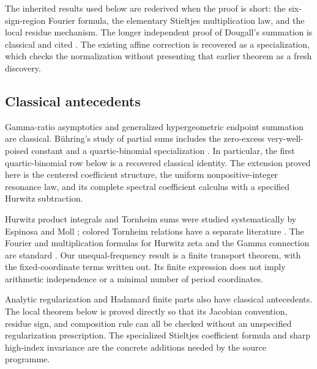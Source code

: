 The inherited results used below are rederived when the proof is short:
the six-sign-region Fourier formula, the elementary Stieltjes
multiplication law, and the local residue mechanism. The longer
independent proof of Dougall's summation is classical and cited
\cite[Eq.~16.4.9]{dlmf-hyper}. The existing affine correction is recovered
as a specialization, which checks the normalization without presenting
that earlier theorem as a fresh discovery.

\subsection{Classical antecedents}
Gamma-ratio asymptotics and generalized hypergeometric endpoint summation
are classical. B\"uhring's study of partial sums includes the zero-excess
very-well-poised constant and a quartic-binomial specialization
\cite[Section 4]{buhring}. In particular, the first quartic-binomial row
below is a recovered classical identity. The extension proved here is
the centered coefficient structure, the uniform nonpositive-integer
resonance law, and its complete spectral coefficient calculus with a
specified Hurwitz subtraction.

Hurwitz product integrals and Tornheim sums were studied systematically
by Espinosa and Moll \cite{em-hurwitz,em-tornheim}; colored Tornheim
relations have a separate literature \cite{zhao}. The Fourier and
multiplication formulas for Hurwitz zeta and the Gamma connection are
standard \cite{dlmf-hurwitz}. Our unequal-frequency result is a finite
transport theorem, with the fixed-coordinate terms written out. Its
finite expression does not imply arithmetic independence or a minimal
number of period coordinates.

Analytic regularization and Hadamard finite parts also have classical
antecedents. The local theorem below is proved directly so that its
Jacobian convention, residue sign, and composition rule can all be
checked without an unspecified regularization prescription. The
specialized Stieltjes coefficient formula and sharp high-index
invariance are the concrete additions needed by the source programme.

